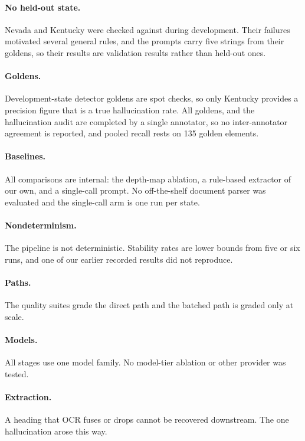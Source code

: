 \documentclass[11pt]{article}
\begin{document}
\paragraph{No held-out state.} Nevada and Kentucky were checked against during
development. Their failures motivated several general rules, and the prompts
carry five strings from their goldens, so their results are validation results rather than held-out ones.

\paragraph{Goldens.} Development-state detector goldens are spot checks, so only Kentucky provides a
precision figure that is a true hallucination rate. All goldens, and the hallucination audit are completed by a single annotator, so no inter-annotator agreement
is reported, and pooled recall rests on 135 golden elements.

\paragraph{Baselines.} All comparisons are internal: the depth-map ablation, a
rule-based extractor of our own, and a single-call prompt. No off-the-shelf
document parser was evaluated and the single-call arm is one run per state.

\paragraph{Nondeterminism.} The pipeline is not deterministic. Stability rates are lower bounds from five or
six runs, and one of our earlier recorded results did not reproduce.

\paragraph{Paths.} The quality suites grade the direct path and the batched path is graded only at scale.

\paragraph{Models.} All stages use one model family. No model-tier ablation or other provider was tested.

\paragraph{Extraction.} A heading that OCR fuses or drops cannot be recovered downstream. The one hallucination arose this way.
\end{document}
